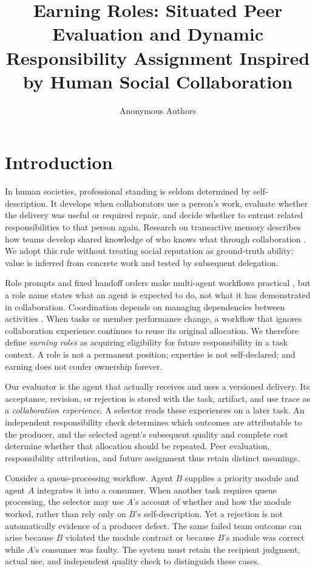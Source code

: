 \documentclass[sigconf,anonymous]{aamas}
\title[Earning Roles]{Earning Roles: Situated Peer Evaluation and Dynamic Responsibility Assignment Inspired by Human Social Collaboration}
\author{Anonymous Authors}
\affiliation{\institution{Anonymous Institution}}
\begin{document}
\maketitle

\section{Introduction}
In human societies, professional standing is seldom determined by self-description. It develops when collaborators use a person's work, evaluate whether the delivery was useful or required repair, and decide whether to entrust related responsibilities to that person again. Research on transactive memory describes how teams develop shared knowledge of who knows what through collaboration \cite{wegner1987transactive,lewis2003transactive}. We adopt this rule without treating social reputation as ground-truth ability: value is inferred from concrete work and tested by subsequent delegation.

Role prompts and fixed handoff orders make multi-agent workflows practical \cite{metagpt2024,wu2023autogen}, but a role name states what an agent is expected to do, not what it has demonstrated in collaboration. Coordination depends on managing dependencies between activities \cite{malone1994coordination}. When tasks or member performance change, a workflow that ignores collaboration experience continues to reuse its original allocation. We therefore define \emph{earning roles} as acquiring eligibility for future responsibility in a task context. A role is not a permanent position; expertise is not self-declared; and earning does not confer ownership forever.

Our evaluator is the agent that actually receives and uses a versioned delivery. Its acceptance, revision, or rejection is stored with the task, artifact, and use trace as a \emph{collaboration experience}. A selector reads these experiences on a later task. An independent responsibility check determines which outcomes are attributable to the producer, and the selected agent's subsequent quality and complete cost determine whether that allocation should be repeated. Peer evaluation, responsibility attribution, and future assignment thus retain distinct meanings.

Consider a queue-processing workflow. Agent $B$ supplies a priority module and agent $A$ integrates it into a consumer. When another task requires queue processing, the selector may use $A$'s account of whether and how the module worked, rather than rely only on $B$'s self-description. Yet a rejection is not automatically evidence of a producer defect. The same failed team outcome can arise because $B$ violated the module contract or because $B$'s module was correct while $A$'s consumer was faulty. The system must retain the recipient judgment, actual use, and independent quality check to distinguish these cases.
\end{document}

